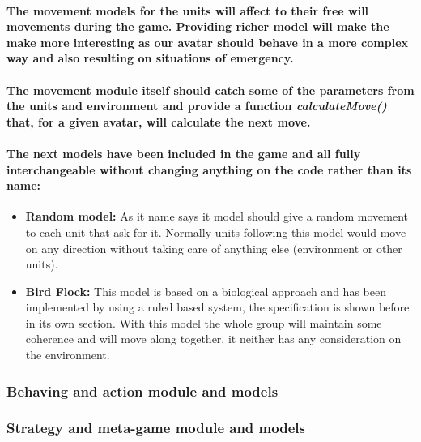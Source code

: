 \documentclass[a4paper,10pt]{article}
\newcommand{\p}[1]{\paragraph{\indent\textnormal{#1}}}
\begin{document}
    \p{The movement models for the units will affect to their free will movements during the game. Providing richer model will make the make more interesting as our avatar should behave in a more complex way and also resulting on situations of emergency.}

    \p{The movement module itself should catch some of the parameters from the units and environment and provide a function \textit{calculateMove()} that, for a given avatar, will calculate the next move.}

    \p{The next models have been included in the game and all fully interchangeable without changing anything on the code rather than its name:}

    \begin{itemize}
     \item \textbf{Random model:} As it name says it model should give a random movement to each unit that ask for it. Normally units following this model would move on any direction without taking care of anything else (environment or other units).
     \item \textbf{Bird Flock:} This model is based on a biological approach and has been implemented by using a ruled based system, the specification is shown before in its own section. With this model the whole group will maintain some coherence and will move along together, it neither has any consideration on the environment.
    \end{itemize}


  \subsubsection{Behaving and action module and models}

  \subsubsection{Strategy and meta-game module and models}
\end{document}
